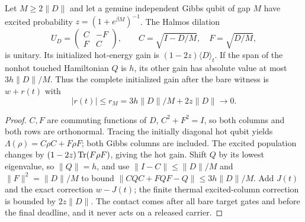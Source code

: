 \begin{lemma}\label{to:sc-lem:hot}
Let $M\ge2\|D\|$ and let a genuine independent Gibbs qubit of gap $M$ have excited probability $z=(1+e^{\beta M})^{-1}$. The Halmos dilation
\[
U_D=\begin{pmatrix}C&-F\\F&C\end{pmatrix},\qquad
C=\sqrt{I-D/M},\quad F=\sqrt{D/M},
\]
is unitary. Its initialized hot-energy gain is $(1-2z)\langle D\rangle_t$. If the span of the nonhot touched Hamiltonian $Q$ is $h$, its other gain has absolute value at most $3h\|D\|/M$. Thus the complete initialized gain after the bare witness is $w+r(t)$ with
\begin{equation}\label{to:sc-eq:hot}
|r(t)|\le r_M=3h\|D\|/M+2z\|D\|\longrightarrow0.
\end{equation}
\end{lemma}
\begin{proof}
$C,F$ are commuting functions of $D$, $C^2+F^2=I$, so both columns and both rows are orthonormal. Tracing the initially diagonal hot qubit yields $\Lambda(\rho)=C\rho C+F\rho F$; both Gibbs columns are included. The excited population changes by $(1-2z)\operatorname{Tr}(F\rho F)$, giving the hot gain. Shift $Q$ by its lowest eigenvalue, so $\|Q\|=h$, and use $\|I-C\|\le\|D\|/M$ and $\|F\|^2=\|D\|/M$ to bound $\|CQC+FQF-Q\|\le3h\|D\|/M$. Add $J(t)$ and the exact correction $w-J(t)$; the finite thermal excited-column correction is bounded by $2z\|D\|$. The contact comes after all bare target gates and before the final deadline, and it never acts on a released carrier.
\end{proof}

